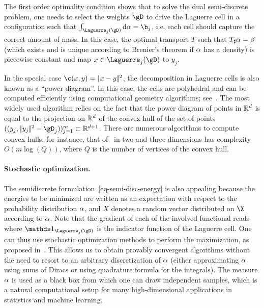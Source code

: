 The first order optimality condition shows that to solve the dual semi-discrete problem, one needs to select the weights $\gD$ to drive the Laguerre cell in a configuration such that $\int_{\Laguerre_{j}(\gD)} \d\al = \b_j$, i.e. each cell should capture the correct amount of mass. In this case, the optimal transport $T$ such that $T_\sharp \alpha=\beta$ (which exists and is unique according to Brenier's theorem if $\alpha$ has a density) is piecewise constant and map $x \in \Laguerre_{j}(\gD)$ to $y_j$.  

In the special case $\c(x,y)=\norm{x-y}^2$, the decomposition in Laguerre cells is also known as a ``power diagram''.  
%
In this case, the cells are polyhedral and can be computed efficiently using computational geometry algorithms; see~\cite{aurenhammer1987power}. 
%
The most widely used algorithm relies on the fact that the power diagram of points in $\mathbb{R}^d$ is equal to the projection on $\mathbb{R}^d$ of the convex hull of the set of points $( (y_j,\norm{y_j}^2 - \gD_j) )_{j=1}^m \subset \RR^{d+1}$. There are numerous algorithms to compute convex hulls; for instance, that of~\cite{chan1996optimal} in two and three dimensions has complexity $O(m\log(Q))$, where $Q$ is the number of vertices of the convex hull.


\paragraph{Stochastic optimization.}

The semidiscrete formulation~\eqref{eq-semi-disc-energy} is also appealing because the energies to be minimized are written as an expectation with respect to the probability distribution $\alpha$,
and $X$ denotes a random vector distributed on $\X$ according to $\alpha$.
%
Note that the gradient of each of the involved functional reads
where $\ones_{\Laguerre_{j}(\gD)}$ is the indicator function of the Laguerre cell. 
%
One can thus use stochastic optimization methods to perform the maximization, as proposed in~\cite{genevay2016stochastic}.
%
This allows us to obtain provably convergent algorithms without the need to resort to an arbitrary discretization of $\alpha$ (either approximating $\alpha$ using sums of Diracs or using quadrature formula for the integrals).
%
The measure $\alpha$ is used as a black box from which one can draw independent samples, which is a natural computational setup for many high-dimensional applications in statistics and machine learning. 

